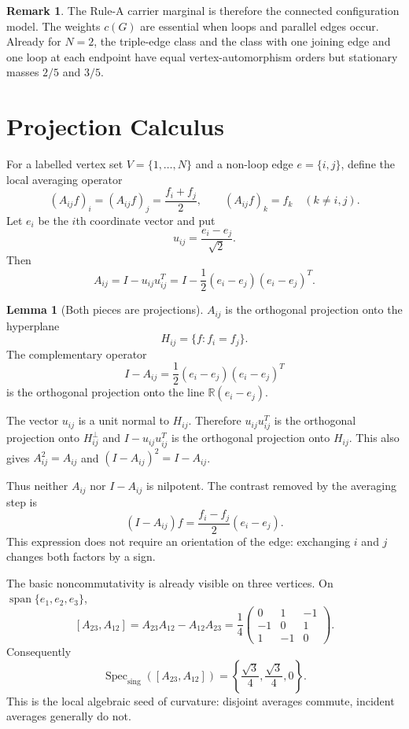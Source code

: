 \documentclass[11pt]{article}
\makeatletter
\newcommand{\R}{\mathbb R}
\newcommand{\Specsing}{\operatorname{Spec}_{\mathrm{sing}}}
\theoremstyle{definition}
\newtheorem{lemma}[theorem]{Lemma}
\newtheorem{remark}[theorem]{Remark}
\renewenvironment{proof}[1][\proofname]{\par
  \pushQED{\qed}%
  \normalfont \topsep6\p@\@plus6\p@\relax
  \trivlist
  \item[\hskip\labelsep\bfseries #1\@addpunct{.}]\ignorespaces
}{%
  \popQED\endtrivlist\@endpefalse
}
\makeatother
\begin{document}
\begin{remark}
The Rule-A carrier marginal is therefore the connected configuration model.
The weights $c(G)$ are essential when loops and parallel edges occur.  Already
for $N=2$, the triple-edge class and the class with one joining edge and one
loop at each endpoint have equal vertex-automorphism orders but stationary
masses $2/5$ and $3/5$.
\end{remark}

\section{Projection Calculus}

For a labelled vertex set $V=\{1,\ldots,N\}$ and a non-loop edge
$e=\{i,j\}$, define the local averaging operator
\[
    (A_{ij}f)_i=(A_{ij}f)_j=\frac{f_i+f_j}{2},
    \qquad
    (A_{ij}f)_k=f_k\quad(k\neq i,j).
\]
Let $e_i$ be the $i$th coordinate vector and put
\[
    u_{ij}=\frac{e_i-e_j}{\sqrt 2}.
\]
Then
\[
    A_{ij}=I-u_{ij}u_{ij}^T
    =
    I-\frac12(e_i-e_j)(e_i-e_j)^T.
\]

\begin{lemma}[Both pieces are projections]
$A_{ij}$ is the orthogonal projection onto the hyperplane
\[
    H_{ij}=\{f:f_i=f_j\}.
\]
The complementary operator
\[
    I-A_{ij}=\frac12(e_i-e_j)(e_i-e_j)^T
\]
is the orthogonal projection onto the line $\R(e_i-e_j)$.
\end{lemma}

\begin{proof}
The vector $u_{ij}$ is a unit normal to $H_{ij}$.  Therefore
$u_{ij}u_{ij}^T$ is the orthogonal projection onto $H_{ij}^\perp$ and
$I-u_{ij}u_{ij}^T$ is the orthogonal projection onto $H_{ij}$.  This also gives
$A_{ij}^2=A_{ij}$ and $(I-A_{ij})^2=I-A_{ij}$.
\end{proof}

Thus neither $A_{ij}$ nor $I-A_{ij}$ is nilpotent.  The contrast removed by the
averaging step is
\[
    (I-A_{ij})f
    =
    \frac{f_i-f_j}{2}(e_i-e_j).
\]
This expression does not require an orientation of the edge: exchanging $i$ and
$j$ changes both factors by a sign.

The basic noncommutativity is already visible on three vertices.  On
$\operatorname{span}\{e_1,e_2,e_3\}$,
\[
    [A_{23},A_{12}]
    =
    A_{23}A_{12}-A_{12}A_{23}
    =
    \frac14
    \begin{pmatrix}
        0&1&-1\\
        -1&0&1\\
        1&-1&0
    \end{pmatrix}.
\]
Consequently
\[
    \Specsing([A_{23},A_{12}])
    =
    \left\{\frac{\sqrt3}{4},\frac{\sqrt3}{4},0\right\}.
\]
This is the local algebraic seed of curvature: disjoint averages commute,
incident averages generally do not.
\end{document}
